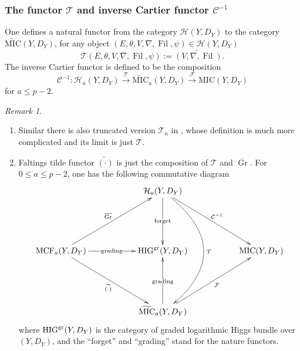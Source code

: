 \documentclass[12pt,twoside]{book}
\theoremstyle{plain}
\theoremstyle{definition}
\theoremstyle{remark}
\newtheorem{remark}[remark]{Remark}
\newcommand{\mC}{{\mathcal C}}
\newcommand{\mF}{{\mathcal F}}
\newcommand{\mT}{{\mathcal T}}
\DeclareMathOperator\Fil{Fil}
\DeclareMathOperator\Gr{Gr}
\newcommand{\MCF}{\mathrm{MCF}}
\newcommand{\MIC}{\mathrm{MIC}}
\numberwithin{equation}{section}
\begin{document}
\subsubsection{The functor $\mathcal{T}$ and inverse Cartier functor $\mathcal{C}^{-1}$}
One defines a natural functor from the category $\mathcal{H}(Y,D_Y)$ to the category $\widetilde{\MIC}(Y,D_Y)$, for any object $(E,\theta,V,\nabla,\Fil,\psi) \in \mathcal{H}(Y,D_Y)$
\[\mathcal{T}(E,\theta,V,\nabla,\Fil,\psi):= \widetilde{(V,\nabla,\Fil)}.\]
The inverse Cartier functor is defined to be the composition
\[\mC^{-1} \colon \mathcal{H}_a(Y,D_Y) \xrightarrow{\mT} \widetilde{\MIC}_a(Y,D_Y) \xrightarrow{\mF} \MIC(Y,D_Y)\]
for $a\leq p-2$.
\begin{remark}
\begin{enumerate}
\item Similar there is also truncated version $\mathcal{T}_n$ in \cite{LSZ19,SYZ22}, whose definition is much more complicated and its limit is just $\mathcal{T}$.
\item Faltings tilde functor $\widetilde{(\cdot)}$ is just the composition of $\mT$ and $\overline{\Gr}$. For $0\leq a\leq p-2$, one has the following commutative diagram
\begin{equation}
\xymatrix@R=2cm@C=2cm{
& \mathcal{H}_a(Y,D_Y)\ar[dr]^-{\mC^{-1}} \ar@/^50pt/[dd]^{\mT} \ar[d]|{\text{forget}}&\\
\MCF_a(Y,D_Y)\ar[dr]_{\widetilde{(\cdot)}}\ar[ur]^{\overline{\Gr}} \ar[r]|{\text{grading}}
& \mathrm{HIG}^{\rm gr}(Y,D_Y) & \MIC(Y,D_Y)\\
&\widetilde{\MIC}_a(Y,D_Y) \ar[ur]_-{\mF} \ar[u]|{\text{grading}}\\
}
\end{equation}
where $\mathrm{HIG}^{\rm gr}(Y,D_Y)$ is the category of graded logarithmic Higgs bundle over $(Y,D_Y)$, and the ``forget'' and ``grading'' stand for the nature functors.
\end{enumerate}
\end{remark}
\end{document}
